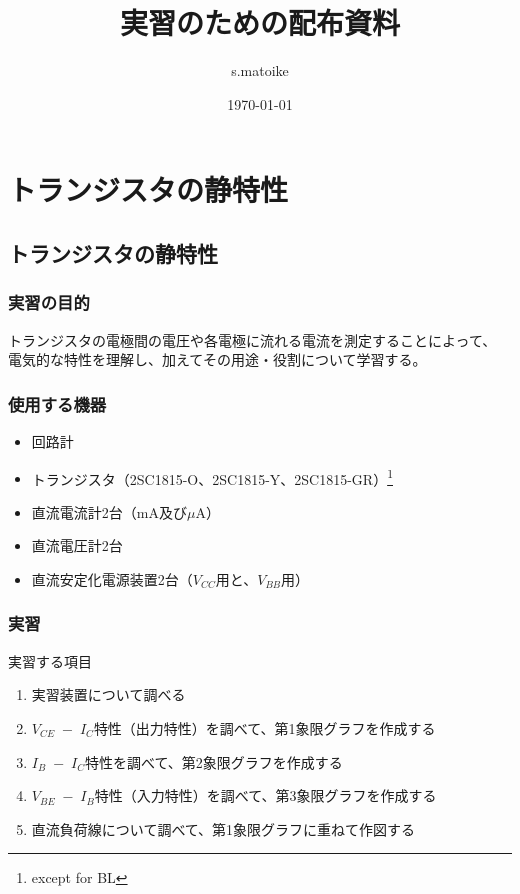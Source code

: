 \documentclass[uplatex,a4paper,11pt,oneside,openany]{jsbook}
\begin{document}
\title{実習のための配布資料}
\author{s.matoike}
\date{\today}
\maketitle

\part{トランジスタの静特性}

\chapter{トランジスタの静特性}

\section{実習の目的}

トランジスタの電極間の電圧や各電極に流れる電流を測定することによって、
電気的な特性を理解し、加えてその用途・役割について学習する。

\section{使用する機器}

\begin{itemize}
\item 回路計
\item トランジスタ（2SC1815-O、2SC1815-Y、2SC1815-GR）\footnote{except for BL}
\item 直流電流計2台（mA及び$\mu$A）
\item 直流電圧計2台
\item 直流安定化電源装置2台（$V_{CC}$用と、$V_{BB}$用）
\end{itemize}

\section{実習}

実習する項目
\begin{enumerate}
\item[(1)] 実習装置について調べる
\item[(2)] $V_{CE}\;-\;I_C$特性（出力特性）を調べて、第1象限グラフを作成する
\item[(3)] $I_B\;-\;I_C$特性を調べて、第2象限グラフを作成する
\item[(4)] $V_{BE}\;-\;I_B$特性（入力特性）を調べて、第3象限グラフを作成する
\item[(5)] 直流負荷線について調べて、第1象限グラフに重ねて作図する
\end{enumerate}
\end{document}
